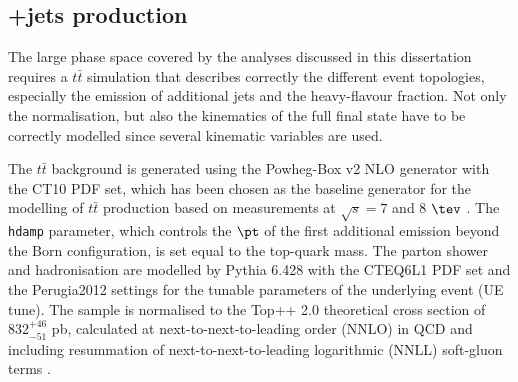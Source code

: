 \subsection[$t\bar{t}$+jets production]{+jets production}
\label{chp:data:sec:ttbar}
The large phase space covered by the analyses discussed in this dissertation requires a $t\bar{t}$ simulation that describes correctly the different event topologies, especially the emission of additional jets and the heavy-flavour fraction. Not only the normalisation, but also the kinematics of the full final state have to be correctly modelled since several kinematic variables are used. 

The  $t\bar{t}$   background is generated using the {\sc Powheg-Box} v2 NLO generator with the CT10 PDF set, which has been chosen as the baseline generator for the modelling of $t\bar{t}$  production based on measurements at $\sqrt{s}=7$ and 8 $\tev$ \cite{Aaboud:2016iot,Aad:2014zka,Aad:2015mbv}. The {\tt hdamp} parameter, which controls the $\pt$ of the first additional emission beyond the Born configuration, is set equal to the top-quark mass. The parton shower and hadronisation are modelled by {\sc Pythia} 6.428 with the CTEQ6L1 PDF set \cite{Pumplin:2002vw} and the Perugia2012 \cite{perugia} settings for the tunable parameters of the underlying event (UE tune). The
sample is normalised to the {\sc Top++} 2.0 \cite{topPP} theoretical cross section of $832^{+46}_{-51}$ pb, calculated at next-to-next-to-leading order (NNLO) in QCD and including resummation of next-to-next-to-leading logarithmic (NNLL) soft-gluon terms \cite{Czakon:2012pz,Czakon:2012zr,Baernreuther:2012ws,Cacciari:2011hy}.

